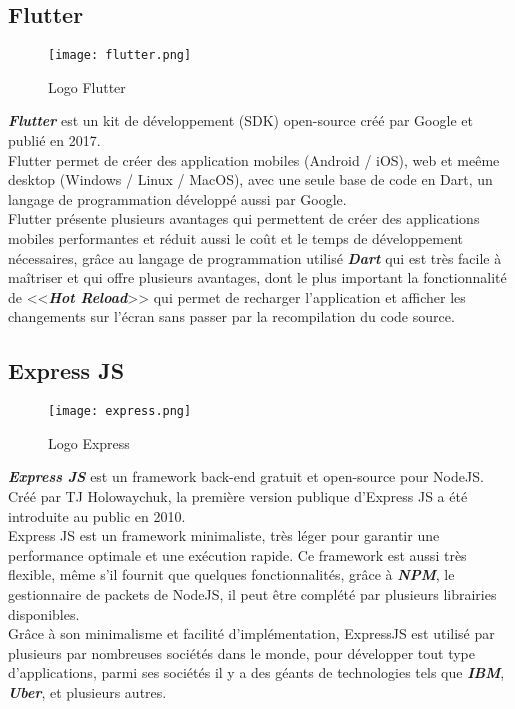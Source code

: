 \subsection{Flutter}
\vspace{1cm}
\begin{figure}[H]
    \centering
    \texttt{[image: flutter.png]}
    \vspace{.5cm}
    \caption{Logo Flutter}
    \label{fig:flutter_logo}
\end{figure}
\textit{\textbf{Flutter}} est un kit de développement (SDK) open-source créé par Google et publié en 2017.\\
\noindent Flutter permet de créer des application mobiles (Android / iOS), web et meême desktop (Windows / Linux / MacOS), avec une seule base de code en Dart, un langage de programmation développé aussi par Google. \\
\noindent Flutter présente plusieurs avantages qui permettent de créer des applications mobiles performantes et réduit aussi le coût et le temps de développement nécessaires, grâce au langage de programmation utilisé \textit{\textbf{Dart}} qui est très facile à maîtriser et qui offre plusieurs avantages, dont le plus important la fonctionnalité de <<\textit{\textbf{Hot Reload}}>> qui permet de recharger l'application et afficher les changements sur l'écran sans passer par la recompilation du code source.
\subsection{Express JS}
\vspace{1cm}
\begin{figure}[H]
    \centering
    \texttt{[image: express.png]}
    \vspace{.5cm}
    \caption{Logo Express}
    \label{fig:express_logo}
\end{figure}
\textit{\textbf{Express JS}} est un framework back-end gratuit et open-source pour NodeJS. Créé par TJ Holowaychuk, la première version publique d'Express JS a été introduite au public en 2010.\\
Express JS est un framework minimaliste, très léger pour garantir une performance optimale et une exécution rapide. Ce framework est aussi très flexible, même s'il fournit que quelques fonctionnalités, grâce à \textit{\textbf{NPM}}, le gestionnaire de packets de NodeJS, il peut être complété par plusieurs librairies disponibles.\\
\noindent Grâce à son minimalisme et facilité d'implémentation, ExpressJS est utilisé par plusieurs par nombreuses sociétés dans le monde, pour développer tout type d'applications, parmi ses sociétés il y a des géants de technologies tels que \textit{\textbf{IBM}}, \textit{\textbf{Uber}}, et plusieurs autres.
